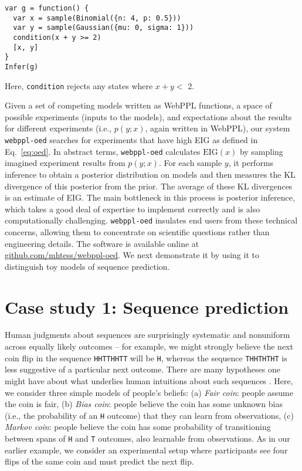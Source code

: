 \documentclass[10pt,letterpaper]{article}
\newcommand{\ndg}[1]{\textcolor{Green}{[ndg: #1]}}
\begin{document}
\begin{lstlisting}[mathescape, label={code:forward-model-complex}]
var g = function() {
  var x = sample(Binomial({n: 4, p: 0.5}))
  var y = sample(Gaussian({mu: 0, sigma: 1}))
  condition(x + y >= 2)
  [x, y]
}
Infer(g)
\end{lstlisting}
Here, \texttt{condition} rejects any states where $x + y <$ 2.

Given a set of competing models written as WebPPL functions, a space of possible experiments (inputs to the models), and expectations about the results for different experiments (i.e., $p(y; x)$, again written in WebPPL), our system \texttt{webppl-oed} searches for experiments that have high EIG as defined in Eq.~\ref{eq:oed}.
In abstract terms, \texttt{webppl-oed} calculates $\mathrm{EIG}(x)$ by sampling imagined experiment results from $p(y; x)$.
For each sample $y$, it performs inference to obtain a posterior distribution on models and then measures the KL divergence of this posterior from the prior.
The average of these KL divergences is an estimate of EIG.
The main bottleneck in this process is posterior inference, which takes a good deal of expertise to implement correctly and is also computationally challenging.
\texttt{webppl-oed} insulates end users from these technical concerns, allowing them to concentrate on scientific questions rather than engineering details.
The software is available online at \break\url{github.com/mhtess/webppl-oed}.
We next demonstrate it by using it to distinguish toy models of sequence prediction.

\section{Case study 1: Sequence prediction}
\label{s:tutorial}

Human judgments about sequences are surprisingly systematic and nonuniform across equally likely outcomes -- for example, we might strongly believe the next coin flip in the sequence \lstinline{HHTTHHTT} will be \lstinline{H}, whereas the sequence \lstinline{THHTHTHT} is less suggestive of a particular next outcome.
There are many hypotheses one might have about what underlies human intuitions about such sequences \citep{goodfellow38:jep, falk81:pme, Griffiths2004_nips}.
Here, we consider three simple models of people's beliefs: (a) \emph{Fair coin}: people assume the coin is fair, (b) \emph{Bias coin}: people believe the coin has some unknown bias (i.e., the probability of an \lstinline{H} outcome) that they can learn from observations, (c) \emph{Markov coin}: people believe the coin has some probability of transitioning between spans of \lstinline{H} and \lstinline{T} outcomes, also learnable from observations.
As in our earlier example, we consider an experimental setup where participants see four flips of the same coin and must predict the next flip.
\end{document}
